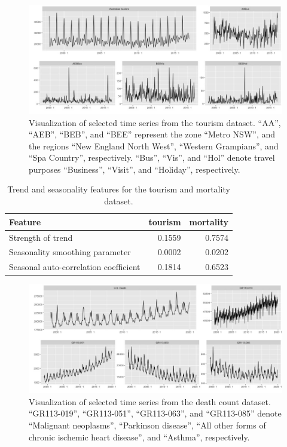 \documentclass[a4paper,review,12pt,authoryear]{elsarticle}
\begin{document}
\begin{figure}[!h]
    \centering
    \includegraphics[width=\textwidth]{../figures/Figure2.jpg}
    \caption{Visualization of selected time series from the tourism dataset. ``AA'', ``AEB'', ``BEB'', and ``BEE'' represent the zone ``Metro NSW'', and the regions ``New England North West'', ``Western Grampians'', and ``Spa Country'', respectively. ``Bus'', ``Vis'', and ``Hol'' denote travel purposes ``Business'', ``Visit'', and ``Holiday'', respectively.}
    \label{fig:tourism}
\end{figure}


\begin{table}[!h]
    \centering
    \caption{\label{tab:features}Trend and seasonality features for the tourism  and mortality dataset.}
    \begin{tabular}{lrr}\toprule
        Feature & tourism &  mortality\\ \midrule
        Strength of trend & 0.1559 & 0.7574 \\
        Seasonality smoothing parameter & 0.0002 & 0.0202 \\ 
        Seasonal auto-correlation coefficient &0.1814  &0.6523  \\ 
 \bottomrule
    \end{tabular}
\end{table}


\begin{figure}[!h]
    \centering
    \vspace{0.2in}
    \includegraphics[width=\textwidth]{../figures/Figure3.jpg}
    \caption{{Visualization of selected time series from the death count dataset.} ``GR113-019'', ``GR113-051'',  ``GR113-063'', and ``GR113-085'' denote ``Malignant neoplasms'', ``Parkinson disease'', ``All other forms of chronic ischemic heart disease'', and ``Asthma'', respectively.}
    \label{fig:mortality}
\end{figure}
\end{document}
